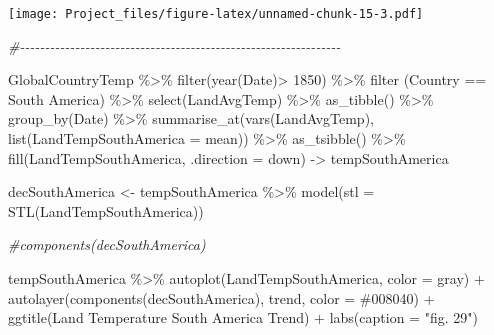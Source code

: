 \documentclass[
]{article}
\newenvironment{Shaded}{\begin{snugshade}}{\end{snugshade}}
\newcommand{\AttributeTok}[1]{\textcolor[rgb]{0.77,0.63,0.00}{#1}}
\newcommand{\CommentTok}[1]{\textcolor[rgb]{0.56,0.35,0.01}{\textit{#1}}}
\newcommand{\DecValTok}[1]{\textcolor[rgb]{0.00,0.00,0.81}{#1}}
\newcommand{\FunctionTok}[1]{\textcolor[rgb]{0.00,0.00,0.00}{#1}}
\newcommand{\NormalTok}[1]{#1}
\newcommand{\OtherTok}[1]{\textcolor[rgb]{0.56,0.35,0.01}{#1}}
\newcommand{\SpecialCharTok}[1]{\textcolor[rgb]{0.00,0.00,0.00}{#1}}
\newcommand{\StringTok}[1]{\textcolor[rgb]{0.31,0.60,0.02}{#1}}
\begin{document}
\texttt{[image: Project\_files/figure-latex/unnamed-chunk-15-3.pdf]}

\begin{Shaded}
\begin{Highlighting}[]
\CommentTok{\#{-}{-}{-}{-}{-}{-}{-}{-}{-}{-}{-}{-}{-}{-}{-}{-}{-}{-}{-}{-}{-}{-}{-}{-}{-}{-}{-}{-}{-}{-}{-}{-}{-}{-}{-}{-}{-}{-}{-}{-}{-}{-}{-}{-}{-}{-}{-}{-}{-}{-}{-}{-}{-}{-}{-}{-}{-}{-}{-}{-}{-}{-}{-}{-}}

\NormalTok{GlobalCountryTemp }\SpecialCharTok{\%\textgreater{}\%}
  \FunctionTok{filter}\NormalTok{(}\FunctionTok{year}\NormalTok{(Date)}\SpecialCharTok{\textgreater{}} \DecValTok{1850}\NormalTok{) }\SpecialCharTok{\%\textgreater{}\%}
  \FunctionTok{filter}\NormalTok{ (Country }\SpecialCharTok{==} \StringTok{\textquotesingle{}South America\textquotesingle{}}\NormalTok{) }\SpecialCharTok{\%\textgreater{}\%}
  \FunctionTok{select}\NormalTok{(LandAvgTemp) }\SpecialCharTok{\%\textgreater{}\%}
  \FunctionTok{as\_tibble}\NormalTok{() }\SpecialCharTok{\%\textgreater{}\%}
  \FunctionTok{group\_by}\NormalTok{(Date) }\SpecialCharTok{\%\textgreater{}\%} 
  \FunctionTok{summarise\_at}\NormalTok{(}\FunctionTok{vars}\NormalTok{(LandAvgTemp), }\FunctionTok{list}\NormalTok{(}\AttributeTok{LandTempSouthAmerica =}\NormalTok{ mean)) }\SpecialCharTok{\%\textgreater{}\%}
  \FunctionTok{as\_tsibble}\NormalTok{() }\SpecialCharTok{\%\textgreater{}\%}
  \FunctionTok{fill}\NormalTok{(LandTempSouthAmerica, }\AttributeTok{.direction =} \StringTok{\textquotesingle{}down\textquotesingle{}}\NormalTok{) }\OtherTok{{-}\textgreater{}}\NormalTok{ tempSouthAmerica}

\NormalTok{decSouthAmerica }\OtherTok{\textless{}{-}}\NormalTok{ tempSouthAmerica }\SpecialCharTok{\%\textgreater{}\%} 
  \FunctionTok{model}\NormalTok{(}\AttributeTok{stl =} \FunctionTok{STL}\NormalTok{(LandTempSouthAmerica))}

\CommentTok{\#components(decSouthAmerica)}

\NormalTok{tempSouthAmerica }\SpecialCharTok{\%\textgreater{}\%}
  \FunctionTok{autoplot}\NormalTok{(LandTempSouthAmerica, }\AttributeTok{color =} \StringTok{\textquotesingle{}gray\textquotesingle{}}\NormalTok{) }\SpecialCharTok{+} 
  \FunctionTok{autolayer}\NormalTok{(}\FunctionTok{components}\NormalTok{(decSouthAmerica), trend, }\AttributeTok{color =} \StringTok{\textquotesingle{}\#008040\textquotesingle{}}\NormalTok{) }\SpecialCharTok{+} 
  \FunctionTok{ggtitle}\NormalTok{(}\StringTok{\textquotesingle{}Land Temperature South America Trend\textquotesingle{}}\NormalTok{) }\SpecialCharTok{+}
  \FunctionTok{labs}\NormalTok{(}\AttributeTok{caption =} \StringTok{"fig. 29"}\NormalTok{)}
\end{Highlighting}
\end{Shaded}
\end{document}

